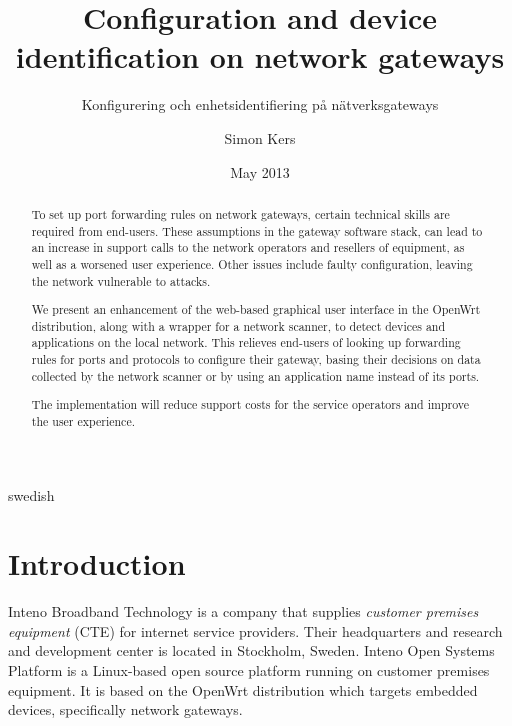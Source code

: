 \documentclass[a4paper,11pt]{kth-bcs}
\title{Configuration and device identification on network gateways}
\subtitle{Konfigurering och enhetsidentifiering på nätverksgateways}
\author{Simon Kers}
\date{May 2013}
\newcommand\blankpage{%
    \null
    \thispagestyle{empty}%
    \addtocounter{page}{-1}%
    \newpage}
\begin{document}
\frontmatter
{}
\setcounter{page}{3}
\pagestyle{center}

\maketitle
\thispagestyle{center}
\begin{abstract}
To set up port forwarding rules on network gateways, certain technical skills are required from end-users.
These assumptions in the gateway software stack, can lead to an increase in support calls to the network operators and resellers of equipment, as well as a worsened user experience.
Other issues include faulty configuration, leaving the network vulnerable to attacks.

We present an enhancement of the web-based graphical user interface in the OpenWrt distribution, along with a wrapper for a network scanner, to detect devices and applications on the local network.
This relieves end-users of looking up forwarding rules for ports and protocols to configure their gateway, basing their decisions on data collected by the network scanner or by using an application name instead of its ports.

The implementation will reduce support costs for the service operators and improve the user experience.

\end{abstract}
\newpage
\blankpage

\begin{foreignabstract}{swedish}

\newpage
\blankpage

\end{foreignabstract}
\clearpage
\tableofcontents*
\mainmatter
\pagestyle{newchap}
\chapter{Introduction}
Inteno Broadband Technology is a company that supplies \emph{customer premises equipment} (CTE) for internet service providers.  
Their headquarters and research and development center is located in Stockholm, Sweden.
Inteno Open Systems Platform is a Linux-based open source platform running on customer premises equipment.
It is based on the OpenWrt distribution which targets embedded devices, specifically network gateways. \cite{Inteno}
\end{document}
